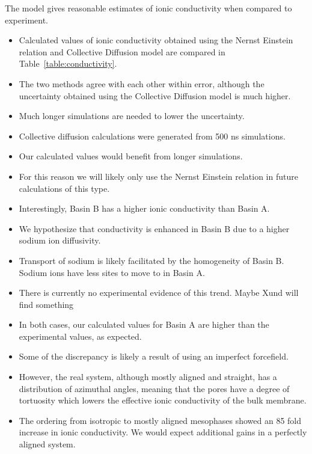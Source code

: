 \documentclass{article}
\begin{document}
  The model gives reasonable estimates of ionic conductivity when compared to 
  experiment.
  \begin{itemize}
  	\item Calculated values of ionic conductivity obtained using the Nernst 
	Einstein relation and Collective Diffusion model are compared in 
	Table~\ref{table:conductivity}.
	\item The two methods agree with each other within error, although the 
	uncertainty obtained using the Collective Diffusion model is much higher.
	\item Much longer simulations are needed to lower the uncertainty. %
	\item Collective diffusion calculations were generated from 
	500 ns simulations.
	\item Our calculated values would benefit from longer simulations. 
	\item For this reason we will likely only use the Nernst Einstein relation
	in future calculations of this type. 
	\item Interestingly, Basin B has a higher ionic conductivity than Basin A.
	\item We hypothesize that conductivity is enhanced in Basin B due to a 
	higher sodium ion diffusivity.
	\item Transport of sodium is likely facilitated by the homogeneity of Basin B.
	Sodium ions have less sites to move to in Basin A.
	\item There is currently no experimental evidence of this trend. Maybe Xund will find something
	\item In both cases, our calculated values for Basin A are higher than the 
	experimental values, as expected. 
	\item Some of the discrepancy is likely a result of using an imperfect forcefield. 
	\item However, the real system, although mostly aligned and straight, has a 
	distribution of azimuthal angles, meaning that the pores have a degree of 
	tortuosity which lowers the effective ionic conductivity of the bulk membrane. 
	\item The ordering from isotropic to mostly aligned mesophases showed an 85 
	fold increase in ionic conductivity. We would expect additional gains in a 
	perfectly aligned system.
  \end{itemize}
	
\end{document}
